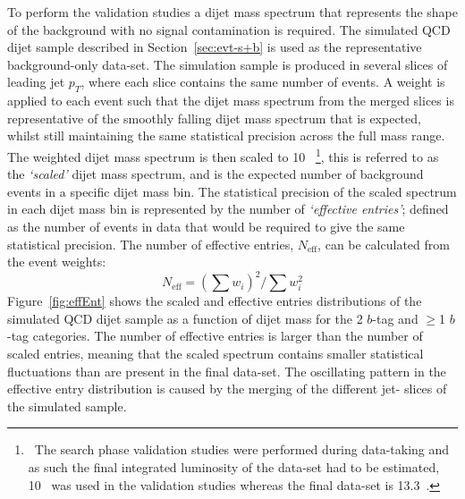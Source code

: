 To perform the validation studies a dijet mass spectrum that represents the shape of the background with no signal contamination is required.
The simulated QCD dijet sample described in Section~\ref{sec:evt-s+b} is used as the representative background-only data-set.
The simulation sample is produced in several slices of leading jet $p_{T}$, where each slice contains the same number of events.
A weight is applied to each event such that the dijet mass spectrum from the merged slices is representative of the smoothly falling dijet mass spectrum that is expected,
whilst still maintaining the same statistical precision across the full mass range.
The weighted dijet mass spectrum is then scaled to 10~\ifb{}
\footnote{
  \ The search phase validation studies were performed during data-taking
  and as such the final integrated luminosity of the data-set had to be estimated,
  10~\ifb{} was used in the validation studies whereas the final data-set is 13.3~\ifb{}.
},
this is referred to as the \textit{`scaled'} dijet mass spectrum, and is the expected number of background events in a specific dijet mass bin. 
The statistical precision of the scaled spectrum in each dijet mass bin is represented by the number of \textit{`effective entries'};
defined as the number of events in data that would be required to give the same statistical precision.
The number of effective entries, $N_{\text{eff}}$, can be calculated from the event weights:
\begin{equation}
  N_{\text{eff}} = (\sum{w_i})^2 / \sum{w_i^2}
  \label{eq:effEnt}
\end{equation}
Figure~\ref{fig:effEnt} shows the scaled and effective entries distributions of the simulated QCD dijet sample
as a function of dijet mass for the 2 $b$-tag and $\geq$1 $b$-tag categories.
The number of effective entries is larger than the number of scaled entries,
meaning that the scaled spectrum contains smaller statistical fluctuations than are present in the final data-set.
The oscillating pattern in the effective entry distribution is caused by the merging of the different jet-\pT{} slices of the simulated sample. 

